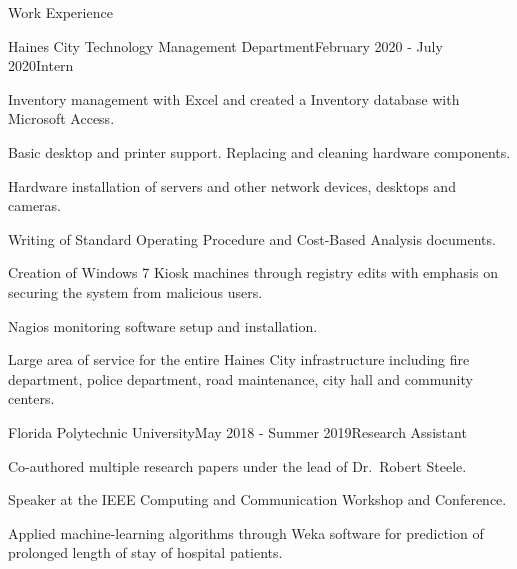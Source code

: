 \documentclass{resume} %
\begin{document}
\begin{rSection}{Work Experience}

\begin{rSubsection}{Haines City Technology Management Department}{February 2020 - July 2020}{Intern}{}
	\item
	Inventory management with Excel and created a Inventory database with Microsoft Access.
	\item
	Basic desktop and printer support. Replacing and cleaning hardware components.
	\item
	Hardware installation of servers and other network devices, desktops and cameras.
	\item
	Writing of Standard Operating Procedure and Cost-Based Analysis documents.
	\item
	Creation of Windows 7 Kiosk machines through registry edits with emphasis on securing the system from malicious users.
	\item
	Nagios monitoring software setup and installation.
	\item
	Large area of service for the entire Haines City infrastructure including fire department, police department, road maintenance, city hall and community centers.
\end{rSubsection}
\newpage
\begin{rSubsection}{Florida Polytechnic University}{May 2018 - Summer 2019}{Research Assistant}{}
	\item
	Co-authored multiple research papers under the lead of Dr.\ Robert Steele.
	\item
	Speaker at the IEEE Computing and Communication Workshop and Conference.
	\item
	Applied machine-learning algorithms through Weka software for prediction of prolonged length of stay of hospital patients.
\end{rSubsection}

\end{rSection}



\end{document}

